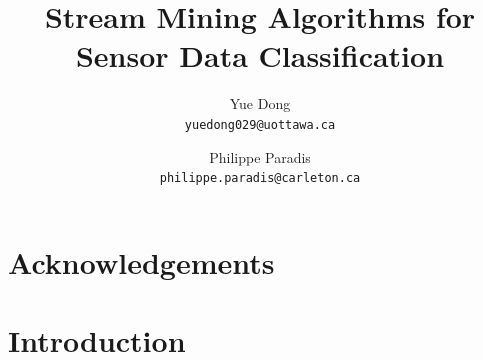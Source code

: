 \documentclass[12pt]{article}
\title{Stream Mining Algorithms for Sensor Data Classification}
\author{
	Yue Dong\\
	\texttt{yuedong029@uottawa.ca}
	\and
	Philippe Paradis\\
	\texttt{philippe.paradis@carleton.ca}
}
\begin{document}
	\singlespace
	\maketitle
	
	\tableofcontents
	\newpage
	\section*{Acknowledgements}
	
	
	\begin{abstract}                %
		
		
	\end{abstract}
	
	\setcounter{secnumdepth}{4}
	
	\section{Introduction}
	\label{sec:introduction}
	
\end{document}
